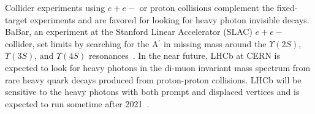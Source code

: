\indent Collider experiments using $e+e-$ or proton collisions complement the fixed-target experiments and are favored for looking for heavy photon invisible decays.  BaBar, an experiment at the Stanford Linear Accelerator (SLAC) $e+e-$ collider, set limits by searching for the A$^{\prime}$ in missing mass around the $\Upsilon(2S)$, $\Upsilon(3S)$, and $\Upsilon(4S)$ resonances~\cite{Lees_2014xha}. In the near future, LHCb at CERN is expected to look for heavy photons in the di-muon invariant mass spectrum from rare heavy quark decays produced from proton-proton collisions. LHCb will be sensitive to the heavy photons with both prompt and displaced vertices and is expected to run sometime after 2021~\cite{Ilten_2016tkc}.
